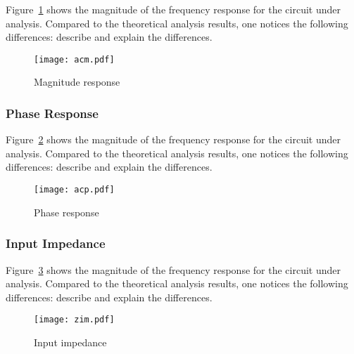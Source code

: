 Figure~\ref{fig:acm} shows the magnitude of the frequency response for the circuit under analysis. Compared to the theoretical analysis results, one notices the following differences: describe and explain the differences.

\begin{figure}[H] \centering
\texttt{[image: acm.pdf]}
\caption{Magnitude response}
\label{fig:acm}
\end{figure}


\subsubsection{Phase Response}

Figure~\ref{fig:acp} shows the magnitude of the frequency response for the circuit under analysis. Compared to the theoretical analysis results, one notices the following differences: describe and explain the differences.

\begin{figure}[H] \centering
\texttt{[image: acp.pdf]}
\caption{Phase response}
\label{fig:acp}
\end{figure}

\subsubsection{Input Impedance}

Figure~\ref{fig:zim} shows the magnitude of the frequency response for the circuit under analysis. Compared to the theoretical analysis results, one notices the following differences: describe and explain the differences.

\begin{figure}[H] \centering
\texttt{[image: zim.pdf]}
\caption{Input impedance}
\label{fig:zim}
\end{figure}





